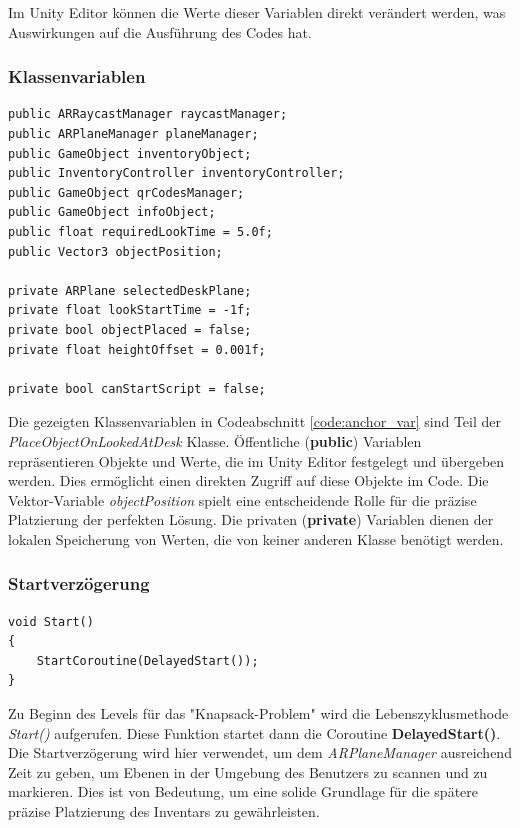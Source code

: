 Im Unity Editor können die Werte dieser Variablen direkt verändert werden, was Auswirkungen auf die Ausführung des Codes hat.\\

\subsubsection{Klassenvariablen}
\begin{lstlisting}[style=csharp, caption={Klassenvariablen der PlacedObjectOnLookedAtDesk Klasse}, label=code:anchor_var]
public ARRaycastManager raycastManager;
public ARPlaneManager planeManager;
public GameObject inventoryObject;
public InventoryController inventoryController;
public GameObject qrCodesManager;
public GameObject infoObject;
public float requiredLookTime = 5.0f;
public Vector3 objectPosition;

private ARPlane selectedDeskPlane;
private float lookStartTime = -1f;
private bool objectPlaced = false;
private float heightOffset = 0.001f;

private bool canStartScript = false;
\end{lstlisting}

Die gezeigten Klassenvariablen in Codeabschnitt \ref{code:anchor_var} sind Teil der \textit{PlaceObjectOnLookedAtDesk} Klasse. Öffentliche
(\textbf{public}) Variablen repräsentieren Objekte und Werte, die im Unity Editor festgelegt und übergeben werden. Dies
ermöglicht einen direkten Zugriff auf diese Objekte im Code. Die Vektor-Variable \textit{objectPosition} spielt eine
entscheidende Rolle für die präzise Platzierung der perfekten Lösung. Die privaten (\textbf{private}) Variablen dienen
der lokalen Speicherung von Werten, die von keiner anderen Klasse benötigt werden.

\subsubsection{Startverzögerung}
\begin{lstlisting}[style=csharp, caption={Beginn des Anchor Scripts}, label=code:Start]
void Start()
{
    StartCoroutine(DelayedStart());
}
\end{lstlisting}
Zu Beginn des Levels für das "Knapsack-Problem" wird die Lebenszyklusmethode \textit{Start()} aufgerufen. Diese Funktion
startet dann die Coroutine \textbf{DelayedStart()}. Die Startverzögerung wird hier verwendet, um dem \textit{ARPlaneManager}
ausreichend Zeit zu geben, um Ebenen in der Umgebung des Benutzers zu scannen und zu markieren. Dies ist von Bedeutung,
um eine solide Grundlage für die spätere präzise Platzierung des Inventars zu gewährleisten.\\

